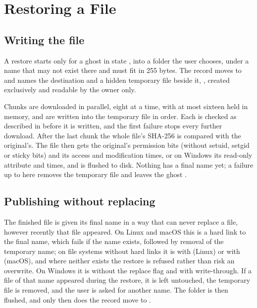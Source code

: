 \section{Restoring a File}\label{sec:restore}

\subsection{Writing the file}
A restore starts only for a ghost in state , into a folder the user chooses, under a
name that may not exist there and must fit in 255 bytes. The record moves to  and
names the destination and a hidden temporary file beside it,
, created exclusively and readable by the owner only.

Chunks are downloaded in parallel, eight at a time, with at most sixteen held in memory, and are
written into the temporary file in order. Each is checked as described in 
before it is written, and the first failure stops every further download. After the last chunk the
whole file's SHA-256 is compared with the original's. The file then gets the original's permission
bits (without setuid, setgid or sticky bits) and its access and modification times, or on Windows
its read-only attribute and times, and is flushed to disk. Nothing has a final name yet; a failure
up to here removes the temporary file and leaves the ghost .

\subsection{Publishing without replacing}\label{sec:publish}
The finished file is given its final name in a way that can never replace a file, however recently
that file appeared. On Linux and macOS this is a hard link to the final name, which fails if the
name exists, followed by removal of the temporary name; on file systems without hard links it is
 with  (Linux) or  with
 (macOS), and where neither exists the restore is refused rather than risk an
overwrite. On Windows it is  without the replace flag and with write-through. If a
file of that name appeared during the restore, it is left untouched, the temporary file is removed,
and the user is asked for another name. The folder is then flushed, and only then does the record
move to .

